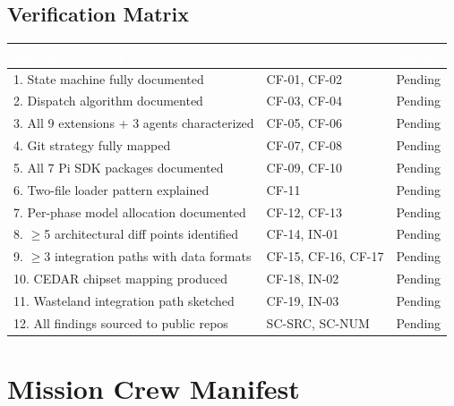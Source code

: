 \documentclass[11pt,letterpaper]{article}
\newcommand{\tableheader}[1]{\textbf{\sffamily\textcolor{white}{#1}}}
\begin{document}
\subsection{Verification Matrix}

\begin{center}
\begin{tabularx}{\textwidth}{XL{3.5cm}C{1.5cm}}
\toprule
{}
\tableheader{Success Criterion} & \tableheader{Test ID(s)} & \tableheader{Status} \\
. State machine fully documented & CF-01, CF-02 & Pending \\
2. Dispatch algorithm documented & CF-03, CF-04 & Pending \\
3. All 9 extensions + 3 agents characterized & CF-05, CF-06 & Pending \\
4. Git strategy fully mapped & CF-07, CF-08 & Pending \\
5. All 7 Pi SDK packages documented & CF-09, CF-10 & Pending \\
6. Two-file loader pattern explained & CF-11 & Pending \\
7. Per-phase model allocation documented & CF-12, CF-13 & Pending \\
8. $\geq$5 architectural diff points identified & CF-14, IN-01 & Pending \\
9. $\geq$3 integration paths with data formats & CF-15, CF-16, CF-17 & Pending \\
10. CEDAR chipset mapping produced & CF-18, IN-02 & Pending \\
11. Wasteland integration path sketched & CF-19, IN-03 & Pending \\
12. All findings sourced to public repos & SC-SRC, SC-NUM & Pending \\
\bottomrule
\end{tabularx}
\end{center}

\section{Mission Crew Manifest}
\end{document}
